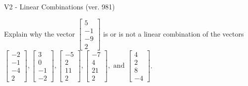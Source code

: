 \begin{exercise}
  \begin{exerciseTitle}V2 - Linear Combinations (ver. 981)\end{exerciseTitle}
  \begin{exerciseStatement}
    Explain why the vector \(\left[\begin{array}{c}
5 \\
-1 \\
-9 \\
2
\end{array}\right]\)  is or is not a linear 
	combination of the vectors \(\left[\begin{array}{c}
-2 \\
-1 \\
-4 \\
2
\end{array}\right] , \left[\begin{array}{c}
3 \\
0 \\
-1 \\
-2
\end{array}\right] , \left[\begin{array}{c}
-5 \\
2 \\
11 \\
2
\end{array}\right] , \left[\begin{array}{c}
-7 \\
4 \\
21 \\
2
\end{array}\right] , \text{ and } \left[\begin{array}{c}
4 \\
2 \\
8 \\
-4
\end{array}\right]\).
	



\end{exerciseStatement}
\end{exercise}
